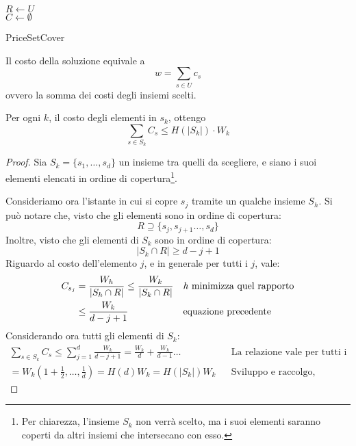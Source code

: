 \begin{algorithm}[H]
    \SetAlgoLined
     $R \gets U$\\
     $C \gets \emptyset$\\
     \caption{PriceSetCover}
\end{algorithm}

\begin{remark}
    \label{oss1set}
    Il costo della soluzione equivale a $$w = \sum_{s\in U}c_s$$ ovvero la somma dei costi 
    degli insiemi scelti.
\end{remark}
\begin{remark}
    \label{oss2set}
    Per ogni $k$, il costo degli elementi in $s_k$, ottengo 
    $$\sum_{s \in S_k}C_s \leq H(|S_k|) \cdot  W_k$$
\end{remark}
\begin{proof}
    Sia $S_k = \{s_1, \dots, s_d\}$ un insieme tra quelli da scegliere, e siano 
    i suoi elementi elencati in ordine di copertura\footnote{Per chiarezza, l'insieme $S_k$ non verrà scelto, 
    ma i suoi elementi saranno coperti da altri insiemi che intersecano con esso.}.

    Consideriamo ora l'istante in cui si copre $s_j$ tramite un qualche insieme $S_h$.
    Si può notare che, visto che gli elementi sono in ordine di copertura: 
    $$R \supseteq \{s_j, s_{j+1} \dots, s_d \}$$
    Inoltre, visto che gli elementi di $S_k$ sono in ordine di copertura: 
    $$|S_k \cap R| \geq d-j+1$$
    Riguardo al costo dell'elemento $j$, e in generale per tutti i $j$, vale:
    \begin{equation}
        \begin{aligned}
            C_{s_j} &= \frac{W_h}{|S_h \cap R|} \leq \frac{W_k}{|S_k \cap R|} && \text{\emph{h} minimizza quel rapporto}\\
            &\leq \frac{W_k}{d-j+1} && \text{equazione precedente}\\
        \end{aligned}
    \end{equation}
    Considerando ora tutti gli elementi di $S_k$: 
    \begin{equation}
        \begin{aligned}
            \sum_{s\in S_k} C_s \leq \sum_{j=1}^{d}\frac{W_k}{d-j+1} = \frac{W_k}{d} + \frac{W_k}{d-1} \dots && \text{La relazione vale per tutti i j}\\
            = W_k(1 + \frac{1}{2}, \dots, \frac{1}{d}) = H(d)W_k = H(|S_k|)W_k && \text{Sviluppo e raccolgo, ottengo l'oss.}
        \end{aligned}
    \end{equation}
\end{proof}
